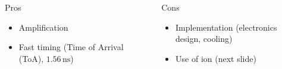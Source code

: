\begin{frame}[t]
  \begin{columns}[T]
    \begin{column}{0.45\textwidth}
      \begin{block}{Pros}
        \begin{itemize}
          \item Amplification
          \item Fast timing (Time of Arrival (ToA), $1.56\,\mathrm{ns}$)
        \end{itemize}
      \end{block}
    \end{column}
    \begin{column}{0.45\textwidth}
      \begin{block}{Cons}
        \begin{itemize}
          \item Implementation (electronics design, cooling)
          \item Use of ion (next slide)
        \end{itemize}
      \end{block}
    \end{column}
  \end{columns}
\end{frame}

